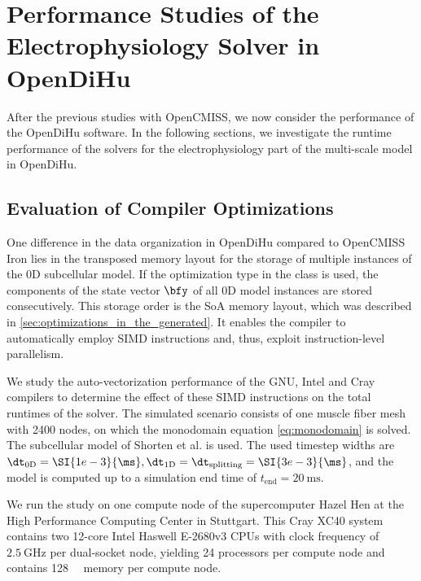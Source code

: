 


\section{Performance Studies of the Electrophysiology Solver in OpenDiHu}\label{sec:performance_studies_of_the_e}
After the previous studies with OpenCMISS, we now consider the performance of the OpenDiHu software.
In the following sections, we investigate the runtime performance of the solvers for the electrophysiology part of the multi-scale model in OpenDiHu.

\subsection{Evaluation of Compiler Optimizations}

One difference in the data organization in OpenDiHu compared to OpenCMISS Iron lies in the transposed memory layout for the storage of multiple instances of the 0D subcellular model. If the  optimization type in the  class is used, the components of the state vector $\bfy$ of all 0D model instances are stored consecutively. This storage order is the SoA memory layout, which was described in \cref{sec:optimizations_in_the_generated}. It enables the compiler to automatically employ SIMD instructions and, thus, exploit instruction-level parallelism.

We study the auto-vectorization performance of the GNU, Intel and Cray compilers to determine the effect of these SIMD instructions on the total runtimes of the solver. The simulated scenario consists of one muscle fiber mesh with 2400 nodes, on which the monodomain equation \cref{eq:monodomain} is solved. The subcellular model of Shorten et al. \cite{Shorten2007} is used. The used timestep widths are $\dt_\text{0D} = \SI{1e-3}{\ms}, \dt_\text{1D} = \dt_\text{splitting} = \SI{3e-3}{\ms}$, and the model is computed up to a simulation end time of $t_\text{end} = \SI{20}{\ms}$.

We run the study on one compute node of the supercomputer Hazel Hen at the High Performance Computing Center in Stuttgart. This Cray XC40 system contains two 12-core Intel Haswell E-2680v3 CPUs with clock frequency of $\SI{2.5}{\giga\hertz}$ per dual-socket node, yielding 24 processors per compute node and contains \SI{128}{\giga\byte} memory per compute node.

